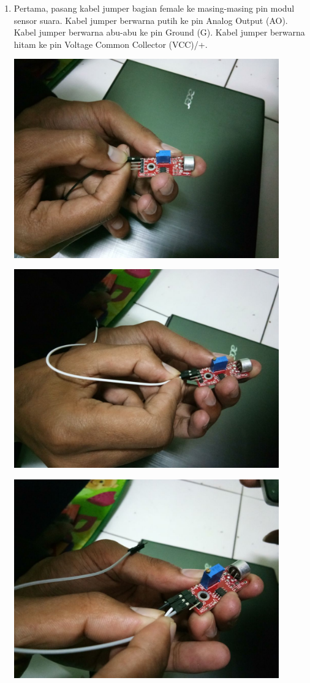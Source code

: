 \begin{enumerate}

\item  Pertama, pasang kabel jumper bagian female ke masing-masing pin modul sensor suara. Kabel jumper berwarna putih ke pin Analog Output (AO). Kabel jumper berwarna abu-abu ke pin Ground (G). Kabel jumper berwarna hitam ke pin Voltage Common Collector (VCC)/+.
\break
\centerline{\includegraphics[width=0.9\textwidth]{figures/ss4.jpeg}}
\break
\centerline{\includegraphics[width=0.9\textwidth]{figures/ss5.jpeg}}
\break
\centerline{\includegraphics[width=0.9\textwidth]{figures/ss6.jpeg}}

\end{enumerate}
